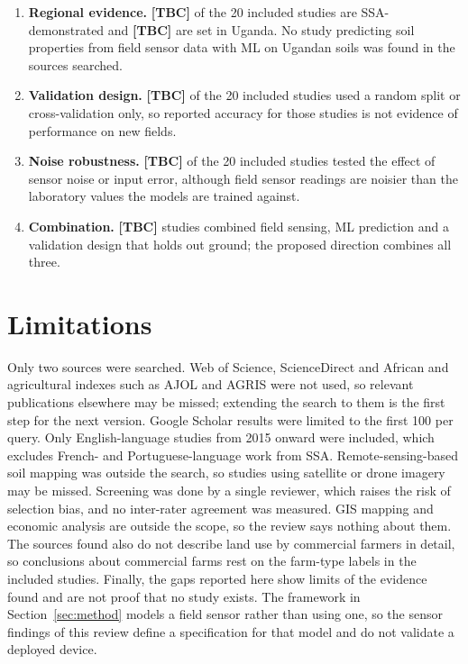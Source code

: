 \documentclass[conference]{IEEEtran}
\newcommand{\TBC}{\textbf{[TBC]}}
\begin{document}
\begin{enumerate}
\item \textbf{Regional evidence.} \TBC{} of the 20 included studies are
SSA-demonstrated and \TBC{} are set in Uganda. No study predicting soil
properties from field sensor data with ML on Ugandan soils was found in the
sources searched.
\item \textbf{Validation design.} \TBC{} of the 20 included studies used a random
split or cross-validation only, so reported accuracy for those studies is not
evidence of performance on new fields.
\item \textbf{Noise robustness.} \TBC{} of the 20 included studies tested the
effect of sensor noise or input error, although field sensor readings are noisier
than the laboratory values the models are trained against.
\item \textbf{Combination.} \TBC{} studies combined field sensing, ML prediction
and a validation design that holds out ground; the proposed direction combines
all three.
\end{enumerate}

\section{Limitations}\label{sec:limits}
Only two sources were searched. Web of Science, ScienceDirect and African and
agricultural indexes such as AJOL and AGRIS were not used, so relevant
publications elsewhere may be missed; extending the search to them is the first
step for the next version. Google Scholar results were limited to the first 100
per query. Only English-language studies from 2015 onward were included, which
excludes French- and Portuguese-language work from SSA. Remote-sensing-based soil
mapping was outside the search, so studies using satellite or drone imagery may
be missed. Screening was done by a single reviewer, which raises the risk of
selection bias, and no inter-rater agreement was measured. GIS mapping and
economic analysis are outside the scope, so the review says nothing about them.
The sources found also do not describe land use by commercial farmers in detail,
so conclusions about commercial farms rest on the farm-type labels in the
included studies. Finally, the gaps reported here show limits of the evidence
found and are not proof that no study exists. The framework in
Section~\ref{sec:method} models a field sensor rather than using one, so the
sensor findings of this review define a specification for that model and do not
validate a deployed device.
\end{document}
